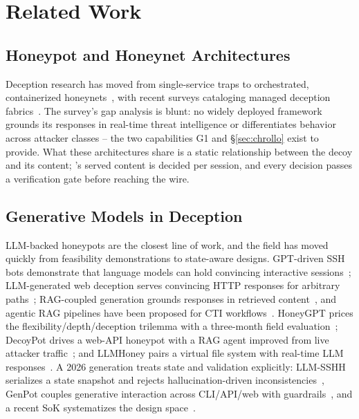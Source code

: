 \section{Related Work}
\label{sec:related}

\subsection{Honeypot and Honeynet Architectures}
Deception research has moved from single-service traps to orchestrated,
containerized honeynets~\cite{spitzner2002,t-pot2024}, with recent
surveys cataloging managed deception fabrics~\cite{lopez2024}. The
survey's gap analysis is blunt: no widely deployed framework grounds its
responses in real-time threat intelligence or differentiates behavior
across attacker classes -- the two capabilities G1 and
\S\ref{sec:chrollo} exist to provide. What these architectures share is
a static relationship between the decoy and its content; \system's
served content is decided per session, and every decision passes a
verification gate before reaching the wire.

\subsection{Generative Models in Deception}
LLM-backed honeypots are the closest line of work, and the field has
moved quickly from feasibility demonstrations to state-aware designs.
GPT-driven SSH bots demonstrate that language models can hold convincing
interactive sessions~\cite{kouremetis2024}; LLM-generated web deception
serves convincing HTTP responses for arbitrary paths~\cite{galah2024};
RAG-coupled generation grounds responses in retrieved
content~\cite{qiao2025,sezgin2025decoypot}, and agentic RAG pipelines
have been proposed for CTI workflows~\cite{belmahjoub2025,gao2025}.
HoneyGPT prices the flexibility/depth/deception trilemma with a
three-month field evaluation~\cite{wang2026honeygpt}; DecoyPot drives a
web-API honeypot with a RAG agent improved from live attacker
traffic~\cite{sezgin2025decoypot}; and LLMHoney pairs a virtual file
system with real-time LLM responses~\cite{malhotra2025llmhoney}. A 2026
generation treats state and validation explicitly: LLM-SSHH serializes a
state snapshot and rejects hallucination-driven
inconsistencies~\cite{li2026llmsshh}, GenPot couples generative
interaction across CLI/API/web with guardrails~\cite{laragutierrez2026genpot},
and a recent SoK systematizes the design space~\cite{bridges2026}.

